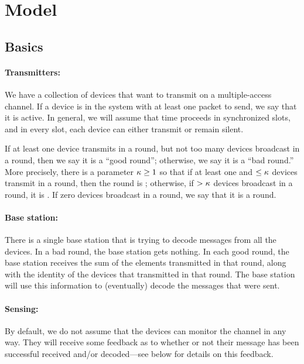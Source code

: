 \section{Model}

\subsection{Basics}

\paragraph{Transmitters:} We have a collection of devices that want to transmit on a multiple-access channel.  
If a device is in the system with at least one packet to send, we say that it is active.  In general, we will assume that time proceeds in synchronized slots, and in every slot, each device can either transmit or remain silent.  

If at least one device transmits in a round, but not too many devices broadcast in a round, then we say it is a ``good round''; otherwise, we say it is a ``bad round.''  More precisely, there is a parameter $\kappa \geq 1$ so that if at least one and $\leq \kappa$ devices transmit in a round, then the round is ; otherwise, if $> \kappa$ devices broadcast in a round, it is .  If zero devices broadcast in a round, we say that it is a  round. 


\paragraph{Base station:} There is a single base station that is trying to decode messages from all the devices.  In a bad round, the base station gets nothing.  In each good round, the base station receives the sum of the elements transmitted in that round, along with the identity of the devices that transmitted in that round.  
The base station will use this information to (eventually) decode the messages that were sent.

\paragraph{Sensing:} By default, we do not assume that the devices can monitor the channel in any way.  They will receive some feedback as to whether or not their message has been successful received and/or decoded---see below for details on this feedback.  

